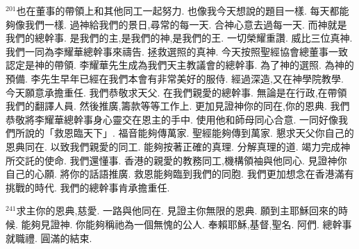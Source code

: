 \documentclass{book}
\begin{document}
$^{201}$也在董事的帶領上和其他同工一起努力.
也像我今天想說的題目一樣.
每天都能夠像我們一樣.
過神給我們的景日,尋常的每一天.
合神心意去過每一天.
而神就是我們的總幹事.
是我們的主,是我們的神,是我們的王.
一切榮耀重讚.
威比三位真神.
我們一同為李耀華總幹事來禱告.
拯救選照的真神.
今天按照聖經協會總董事一致認定是神的帶領.
李耀華先生成為我們天主教議會的總幹事.
為了神的選照.
為神的預備.
李先生早年已經在我們本會有非常美好的服侍.
經過深造,又在神學院教學.
今天願意承擔重任.
我們恭敬求天父.
在我們親愛的總幹事.
無論是在行政,在帶領我們的翻譯人員.
然後推廣,籌款等等工作上.
更加見證神你的同在,你的恩典.
我們恭敬將李耀華總幹事身心靈交在恩主的手中.
使用他和師母同心合意.
一同好像我們所說的「救恩臨天下」.
福音能夠傳萬家.
聖經能夠傳到萬家.
懇求天父你自己的恩典同在.
以致我們親愛的同工.
能夠按著正確的真理.
分解真理的道.
竭力完成神所交託的使命.
我們還懂事.
香港的親愛的教務同工,機構領袖與他同心.
見證神你自己的心願.
將你的話語推廣.
救恩能夠臨到我們的同胞.
我們更加想念在香港滿有挑戰的時代.
我們的總幹事肯承擔重任.

$^{241}$求主你的恩典,慈愛.
一路與他同在.
見證主你無限的恩典.
願到主耶穌回來的時候.
能夠見證神.
你能夠稱祂為一個無愧的公人.
奉賴耶穌,基督,聖名.
阿們.
總幹事就職禮.
圓滿的結束.
\newpage

\allsectionsfont{\centering}

\setlength\parindent{0pt}
\setlength{\columnsep}{1.25em}
\setlength{\parfillskip}{0pt}
\setlength{\tabcolsep}{1em}
\raggedbottom



\newfontfamily{}
\newfontfamily{}
\newfontfamily{}
\newfontfamily{}
\newfontfamily{}
\newcommand{\chfont}[1]{\centerfont{\huge\textcolor{hcolor}{#1}}}
\newcommand{\leftcitation}[1]{\leftcitationfont{\Large\textcolor{hcolor}{#1}}}
\newcommand{\rightcitation}[1]{\rightcitationfont{\normalsize\textcolor{rcolor}{#1}}}
\newfontfamily{}
\end{document}
